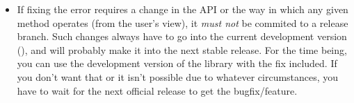 \begin{itemize}
\begin{itemize}
  \item If fixing the error requires a change in the API or the way in which any given method operates (from the user's view), it \emph{must not} be commited to a release branch. Such changes always have to go into the current development version (), and will probably make it into the next stable release. For the time being, you can use the development version of the library with the fix included. If you don't want that or it isn't possible due to whatever circumstances, you have to wait for the next official release to get the bugfix/feature.
  \end{itemize}
\end{itemize}
